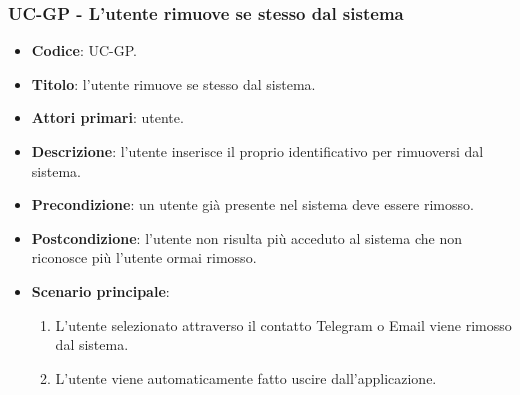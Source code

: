 \subsubsection{UC\theuccount-GP - L'utente rimuove se stesso dal sistema}

\begin{itemize}
	\item \textbf{Codice}: UC\theuccount-GP.
	\item \textbf{Titolo}: l'utente rimuove se stesso dal sistema.
	\item \textbf{Attori primari}: utente.
	\item \textbf{Descrizione}:  l’utente inserisce il proprio identificativo per rimuoversi dal sistema.
	\item \textbf{Precondizione}: un utente già presente nel sistema deve essere rimosso.
	\item \textbf{Postcondizione}: l'utente non risulta più acceduto al sistema che non riconosce più l'utente ormai rimosso.
	\item \textbf{Scenario principale}:
	\begin{enumerate}
		\item L'utente selezionato attraverso il contatto Telegram o Email viene rimosso dal sistema.
		\item L'utente viene automaticamente fatto uscire dall'applicazione.
	\end{enumerate}
\end{itemize}